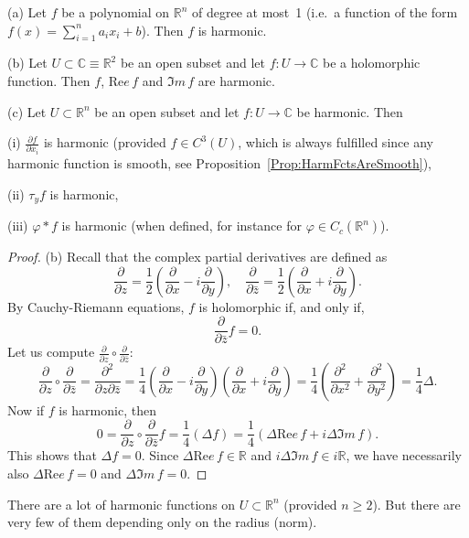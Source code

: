 \documentclass[12pt, oneside, a4paper]{article}
\def\RePart{\Re e \,}
\def\ImPart{\Im m \,}
\theoremstyle{dfn}
\def\Rbb{\ensuremath{\mathbb{R}}}
\renewcommand{\Re}{\text{Re}}
\newcommand{\Com}{\mathbb{C}}
\begin{document}
(a) Let $f$ be a polynomial on $\Rbb^n$ of degree at most~1 (i.e.\ a function of the form $f(x) = \sum_{i=1}^n a_i x_i + b$). Then $f$ is harmonic.

(b) Let $U \subset \Com \equiv \Rbb^2$ be an open subset and let $f \colon U \to \Com$ be a holomorphic function. Then $f$, $\RePart f$ and $\ImPart f$ are harmonic.

(c) Let $U \subset \Rbb^n$ be an open subset and let $f \colon U \to \Com$ be harmonic. Then

\indent \indent (i)
$\frac{\partial f}{\partial x_i}$ is harmonic (provided $f \in C^3(U)$, which is always fulfilled since any harmonic function is smooth, see Proposition~\ref{Prop:HarmFctsAreSmooth}),

\indent \indent (ii)
$\tau_y f$ is harmonic,

\indent \indent (iii)
$\varphi * f$ is harmonic (when defined, for instance for $\varphi \in C_c(\Rbb^n)$).

\begin{proof}
(b) Recall that the complex partial derivatives are defined as
\[
\frac{\partial}{\partial z} = \frac{1}{2} \left( \frac{\partial}{\partial x} -i \frac{\partial}{\partial y} \right), \quad
\frac{\partial}{\partial \bar{z}} = \frac{1}{2} \left( \frac{\partial}{\partial x} +i \frac{\partial}{\partial y} \right).
\]
By Cauchy-Riemann equations, $f$ is holomorphic if, and only if, 
\[
\frac{\partial}{\partial \bar{z}}f = 0.
\]
Let us compute $\frac{\partial}{\partial z} \circ \frac{\partial}{\partial \bar{z}}$:
\[
\frac{\partial}{\partial z} \circ \frac{\partial}{\partial \bar{z}}
= \frac{\partial^2}{\partial z \partial \bar{z}}
= \frac{1}{4} \left( \frac{\partial}{\partial x} -i \frac{\partial}{\partial y} \right) \left( \frac{\partial}{\partial x} +i \frac{\partial}{\partial y} \right)
= \frac{1}{4} \left( \frac{\partial^2}{\partial x^2} + \frac{\partial^2}{\partial y^2} \right)
= \frac{1}{4} \Delta.
\]
Now if $f$ is harmonic, then
\[
0
= \frac{\partial}{\partial z} \circ \frac{\partial}{\partial \bar{z}} f
= \frac{1}{4} (\Delta f)
= \frac{1}{4} (\Delta \RePart f + i\Delta \ImPart f).
\]
This shows that $\Delta f = 0$. Since $\Delta \RePart f \in \Rbb$ and $i\Delta \ImPart f \in i\Rbb$, we have necessarily also $\Delta \RePart f = 0$ and $\Delta \ImPart f = 0$.
\end{proof}

There are a lot of harmonic functions on $U \subset \Rbb^n$ (provided $n \geqslant 2$). But there are very few of them depending only on the radius (norm).
\end{document}
